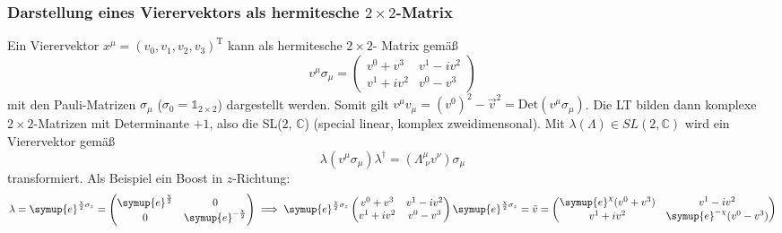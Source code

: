 \documentclass[
  captions=tableheading,  %
  titlepage=firstiscover, %
]{scrartcl}
\begin{document}
\subsubsection{Darstellung eines Vierervektors als hermitesche \texorpdfstring{$2 \times 2$}{PDFstring}-Matrix}
\label{sub:2times2}
Ein Vierervektor $x^{\mu} = (v_0, v_1, v_2, v_3)^\text{T}$ kann als 
hermitesche $2 \times 2$- Matrix gemäß
\begin{equation*}
  v^{\mu} \sigma_{\mu} = 
  \begin{pmatrix}
    v^0 + v^3& v^1 - iv^2 \\
    v^1 + iv^2 & v^0 - v^3
  \end{pmatrix}
\end{equation*}
mit den Pauli-Matrizen $\sigma_{\mu}$ ($\sigma_0 = \mathbb{1}_{2 \times 2}$) dargestellt werden.
Somit gilt $v^{\mu} v_{\mu} = {(v^0)^2 - \vec{v}^2} = \text{Det}(v^{\mu} \sigma_{\mu})$.
Die LT bilden dann komplexe $2\times 2$-Matrizen mit Determinante $+ 1$, also  
die SL(2, $\mathbb{C}$) (special linear, komplex zweidimensonal).
Mit $\lambda(\Lambda) \in SL(2, \mathbb{C})$ wird ein Vierervektor gemäß
\begin{equation*}
  \lambda (v^{\mu} \sigma_{\mu}) \lambda^{\dagger} = (\Lambda_{\; \nu}^{\mu} v^{\nu}) \sigma_{\mu}
\end{equation*}
transformiert.
Als Beispiel ein Boost in $z$-Richtung:
\begin{equation*}
  \lambda  = \symup{e}^{\frac{\chi}{2} \sigma_z}
  =
  \begin{pmatrix}
    \symup{e}^{\frac{\chi}{2}} & 0 \\
    0 & \symup{e}^{-\frac{\chi}{2}}
  \end{pmatrix}
  \implies  
  \symup{e}^{\frac{\chi}{2} \sigma_z} 
  \begin{pmatrix}
    v^0 + v^3& v^1 - iv^2 \\
    v^1 + iv^2 & v^0 - v^3
  \end{pmatrix}
  \symup{e}^{\frac{\chi}{2} \sigma_z} 
  = \tilde{v} =
  \begin{pmatrix}
    \symup{e}^{\chi} (v^0 + v^3) & v^1 - iv^2 \\
    v^1 + iv^2 & \symup{e}^{-\chi}(v^0 - v^3)
  \end{pmatrix}
\end{equation*}
\end{document}
